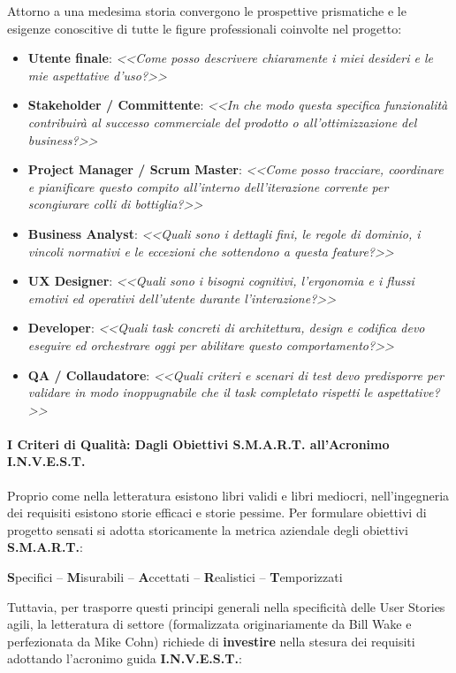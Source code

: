 \documentclass[12pt]{extarticle}
\begin{document}
\noindent Attorno a una medesima storia convergono le prospettive prismatiche e le esigenze conoscitive di tutte le figure professionali coinvolte nel progetto:
\begin{itemize}
    \item \textbf{Utente finale}: \textit{<<Come posso descrivere chiaramente i miei desideri e le mie aspettative d'uso?>>}
    \item \textbf{Stakeholder / Committente}: \textit{<<In che modo questa specifica funzionalità contribuirà al successo commerciale del prodotto o all'ottimizzazione del business?>>}
    \item \textbf{Project Manager / Scrum Master}: \textit{<<Come posso tracciare, coordinare e pianificare questo compito all'interno dell'iterazione corrente per scongiurare colli di bottiglia?>>}
    \item \textbf{Business Analyst}: \textit{<<Quali sono i dettagli fini, le regole di dominio, i vincoli normativi e le eccezioni che sottendono a questa feature?>>}
    \item \textbf{UX Designer}: \textit{<<Quali sono i bisogni cognitivi, l'ergonomia e i flussi emotivi ed operativi dell'utente durante l'interazione?>>}
    \item \textbf{Developer}: \textit{<<Quali task concreti di architettura, design e codifica devo eseguire ed orchestrare oggi per abilitare questo comportamento?>>}
    \item \textbf{QA / Collaudatore}: \textit{<<Quali criteri e scenari di test devo predisporre per validare in modo inoppugnabile che il task completato rispetti le aspettative?>>}
\end{itemize}

\paragraph{I Criteri di Qualità: Dagli Obiettivi S.M.A.R.T. all'Acronimo I.N.V.E.S.T.}
Proprio come nella letteratura esistono libri validi e libri mediocri, nell'ingegneria dei requisiti esistono storie efficaci e storie pessime. Per formulare obiettivi di progetto sensati si adotta storicamente la metrica aziendale degli obiettivi \textbf{S.M.A.R.T.}:
\begin{center}
\textbf{S}pecifici \quad -- \quad \textbf{M}isurabili \quad -- \quad \textbf{A}ccettati \quad -- \quad \textbf{R}ealistici \quad -- \quad \textbf{T}emporizzati
\end{center}
Tuttavia, per trasporre questi principi generali nella specificità delle User Stories agili, la letteratura di settore (formalizzata originariamente da Bill Wake e perfezionata da Mike Cohn) richiede di \textbf{investire} nella stesura dei requisiti adottando l'acronimo guida \textbf{I.N.V.E.S.T.}:
\end{document}
